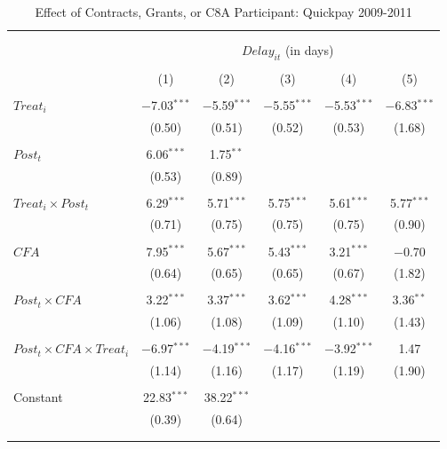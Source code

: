 \documentclass[
]{article}
\begin{document}
\begin{table}[H] \centering 
  \caption{Effect of Contracts, Grants, or C8A Participant: Quickpay 2009-2011} 
  \label{} 
\small 
\begin{tabular}{@{\extracolsep{-2pt}}lccccc} 
\\[-1.8ex]\hline 
\hline \\[-1.8ex] 
\\[-1.8ex] & \multicolumn{5}{c}{$Delay_{it}$ (in days)} \\ 
\\[-1.8ex] & (1) & (2) & (3) & (4) & (5)\\ 
\hline \\[-1.8ex] 
 $Treat_i$ & $-$7.03$^{***}$ & $-$5.59$^{***}$ & $-$5.55$^{***}$ & $-$5.53$^{***}$ & $-$6.83$^{***}$ \\ 
  & (0.50) & (0.51) & (0.52) & (0.53) & (1.68) \\ 
  & & & & & \\ 
 $Post_t$ & 6.06$^{***}$ & 1.75$^{**}$ &  &  &  \\ 
  & (0.53) & (0.89) &  &  &  \\ 
  & & & & & \\ 
 $Treat_i \times Post_t$ & 6.29$^{***}$ & 5.71$^{***}$ & 5.75$^{***}$ & 5.61$^{***}$ & 5.77$^{***}$ \\ 
  & (0.71) & (0.75) & (0.75) & (0.75) & (0.90) \\ 
  & & & & & \\ 
 $CFA$ & 7.95$^{***}$ & 5.67$^{***}$ & 5.43$^{***}$ & 3.21$^{***}$ & $-$0.70 \\ 
  & (0.64) & (0.65) & (0.65) & (0.67) & (1.82) \\ 
  & & & & & \\ 
 $Post_t \times CFA$ & 3.22$^{***}$ & 3.37$^{***}$ & 3.62$^{***}$ & 4.28$^{***}$ & 3.36$^{**}$ \\ 
  & (1.06) & (1.08) & (1.09) & (1.10) & (1.43) \\ 
  & & & & & \\ 
 $Post_t \times CFA \times Treat_i$ & $-$6.97$^{***}$ & $-$4.19$^{***}$ & $-$4.16$^{***}$ & $-$3.92$^{***}$ & 1.47 \\ 
  & (1.14) & (1.16) & (1.17) & (1.19) & (1.90) \\ 
  & & & & & \\ 
 Constant & 22.83$^{***}$ & 38.22$^{***}$ &  &  &  \\ 
  & (0.39) & (0.64) &  &  &  \\ 
  & & & & & \\ 
\hline \\[-1.8ex] 

\end{tabular}
\end{table}
\end{document}
